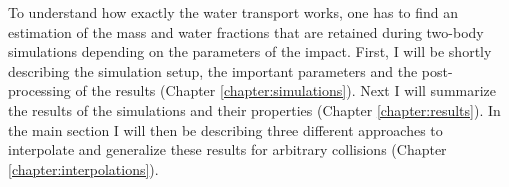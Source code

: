 
To understand how exactly the water transport works, one has to find an estimation of the mass and water fractions that are retained during two-body simulations depending on the parameters of the impact.
First, I will be shortly describing the simulation setup, the important parameters and the post-processing of the results (Chapter \ref{chapter:simulations}). Next I will summarize the results of the simulations and their properties (Chapter \ref{chapter:results}). In the main section I will then be describing three different approaches to interpolate and generalize these results for arbitrary collisions (Chapter \ref{chapter:interpolations}). 
